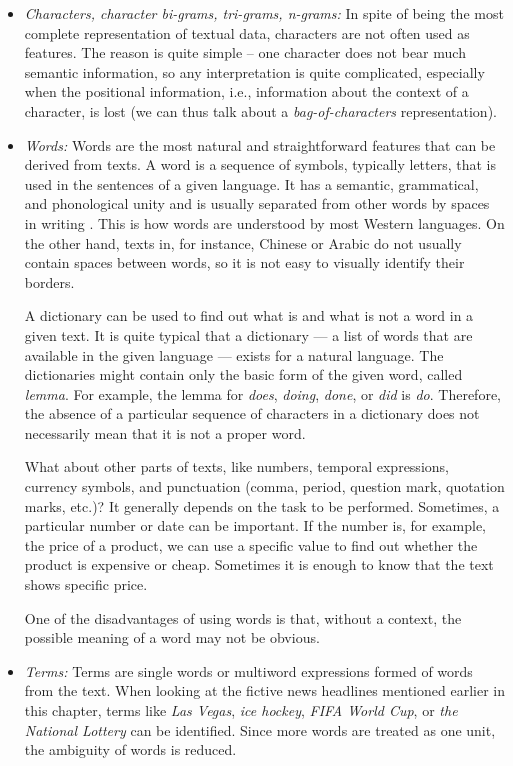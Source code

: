 \begin{itemize}
    \item \textit{Characters, character bi-grams, tri-grams, n-grams:} In spite of being
the most complete representation of textual data, characters are not often
used as features. The reason is quite simple – one character does not bear
much semantic information, so any interpretation is quite complicated,
especially when the positional information, i.e., information about the context
of a character, is lost (we can thus talk about a \textit{bag-of-characters}
representation).

    \item \textit{Words:} Words are the most natural and straightforward features that can
be derived from texts. A word is a sequence of symbols, typically letters, that is
used in the sentences of a given language. It has a semantic, grammatical, and
phonological unity and is usually separated from other words by spaces in writing \cite{ref74}.
This is how words are understood by most Western languages. On the other hand,
texts in, for instance, Chinese or Arabic do not usually contain spaces between words,
so it is not easy to visually identify their borders.

A dictionary can be used to find out what is and what is not a word in
a given text. It is quite typical that a dictionary — a list of words that are
available in the given language — exists for a natural language. The
dictionaries might contain only the basic form of the given word, called
\textit{lemma}. For example, the lemma for \textit{does}, \textit{doing}, \textit{done}, or \textit{did} is
\textit{do}. Therefore, the absence of a particular sequence of characters in a
dictionary does not necessarily mean that it is not a proper word.

What about other parts of texts, like numbers, temporal expressions, currency symbols, and punctuation (comma, period, question mark, quotation marks, etc.)? It generally depends on the task to be performed. Sometimes, a particular number or date can be important. If the number is, for
example, the price of a product, we can use a specific value to find out
whether the product is expensive or cheap. Sometimes it is enough to
know that the text shows specific price.

One of the disadvantages of using words is that, without a context, the
possible meaning of a word may not be obvious.

    \item \textit{Terms:} Terms are single words or multiword expressions formed of words
from the text. When looking at the fictive news headlines mentioned earlier in this
chapter, terms like \textit{Las Vegas}, \textit{ice hockey}, \textit{FIFA World Cup}, or
\textit{the National Lottery} can be identified. Since more words are treated as
one unit, the ambiguity of words is reduced.


\end{itemize}
